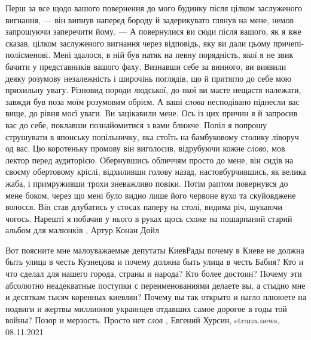 Перш за все щодо вашого повернення до мого будинку після цілком заслуженого
вигнання, — він випнув наперед бороду й задерикувато глянув на мене, немов
запрошуючи заперечити йому. — А повернулися ви сюди після вашого, як я вже
сказав, цілком заслуженого вигнання через відповідь, яку ви дали цьому
причепі-полісменові. Мені здалося, в ній був натяк на певну порядність, якої я
не звик бачити у представників вашого фаху. Визнавши себе за винного, ви
виявили деяку розумову незалежність і широчінь поглядів, що й притягло до себе
мою прихильну увагу. Різновид породи людської, до якої ви маєте нещастя
належати, завжди був поза моїм розумовим обрієм. А ваші \emph{слова}
несподівано піднесли вас вище, до рівня моєї уваги. Ви зацікавили мене. Ось із
цих причин я й запросив вас до себе, поклавши познайомитися з вами ближче.
Попіл я попрошу струшувати в японську попільничку, яка стоїть на бамбуковому
столику ліворуч од вас.  Цю коротеньку промову він виголосив, відрубуючи кожне
\emph{слово}, мов лектор перед аудиторією. Обернувшись обличчям просто до мене,
він сидів на своєму обертовому кріслі, відхиливши голову назад,
настовбурчившись, як велика жаба, і примруживши трохи зневажливо повіки. Потім
раптом повернувся до мене боком, через що мені було видно лише його червоне
вухо та скуйовджене волосся. Він став длубатись у стосах паперу на столі,
видима річ, шукаючи чогось. Нарешті я побачив у нього в руках щось схоже на
пошарпаний старий альбом для малюнків
, Артур Конан Дойл

Вот поясните мне малоуважаемые депутаты КиевРады почему в Киеве не должна быть
улица в честь Кузнецова и почему должна быть улица в честь Бабия?  Кто и что
сделал для нашего города, страны и народа?  Кто более достоин?  Почему эти
абсолютно неадекватные поступки с переименованиями делаете вы, а стыдно мне и
десяткам тысяч коренных киевлян?  Почему вы так открыто и нагло плююете на
подвиги и жертвы миллионов украинцев отдавших самое дорогое в годы той войны?
Позор и мерзость.  Просто нет \emph{слов}
, 
Евгений Хурсин, strana.news, 08.11.2021

